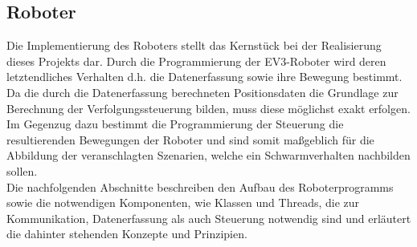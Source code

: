 \subsection{Roboter}
Die Implementierung des Roboters stellt das Kernstück bei der Realisierung dieses Projekts dar. Durch die Programmierung der
EV3-Roboter wird deren letztendliches Verhalten d.h. die Datenerfassung sowie ihre Bewegung bestimmt. Da die durch die Datenerfassung 
berechneten Positionsdaten die Grundlage zur Berechnung der Verfolgungssteuerung bilden, muss diese möglichst exakt erfolgen.
Im Gegenzug dazu bestimmt die Programmierung der Steuerung die resultierenden Bewegungen der Roboter und sind somit maßgeblich für die 
Abbildung der veranschlagten Szenarien, welche ein Schwarmverhalten nachbilden sollen. \\
Die nachfolgenden Abschnitte beschreiben den Aufbau des Roboterprogramms sowie die notwendigen Komponenten, wie Klassen und 
Threads, die zur Kommunikation, Datenerfassung als auch Steuerung notwendig sind und erläutert die dahinter stehenden Konzepte 
und Prinzipien.
